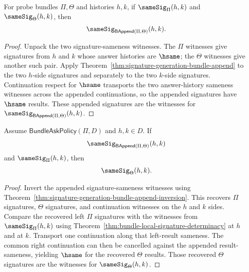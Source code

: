 \begin{theorem}
\label{thm:samesig-bundle-append-closure}
For probe bundles $\Pi,\Theta$ and histories $h,k$, if $\sameSig_\Pi(h,k)$ and $\sameSig_\Theta(h,k)$, then
$$
\sameSig_{\mathsf{BAppend}(\Pi,\Theta)}(h,k).
$$
\end{theorem}
\begin{proof}
Unpack the two signature-sameness witnesses. The $\Pi$ witnesses give signatures from $h$ and $k$ whose answer histories are $\hsame$; the $\Theta$ witnesses give another such pair. Apply Theorem~\ref{thm:signature-generation-bundle-append} to the two $h$-side signatures and separately to the two $k$-side signatures. Continuation respect for $\hsame$ transports the two answer-history sameness witnesses across the appended continuations, so the appended signatures have $\hsame$ results. These appended signatures are the witnesses for $\sameSig_{\mathsf{BAppend}(\Pi,\Theta)}(h,k)$.
\end{proof}

\begin{theorem}
\label{thm:samesig-bundle-append-left-cancellation}
Assume $\mathsf{BundleAskPolicy}(\Pi,D)$ and $h,k\in D$. If
$$
\sameSig_{\mathsf{BAppend}(\Pi,\Theta)}(h,k)
$$
and $\sameSig_\Pi(h,k)$, then
$$
\sameSig_\Theta(h,k).
$$
\end{theorem}
\begin{proof}
Invert the appended signature-sameness witnesses using Theorem~\ref{thm:signature-generation-bundle-append-inversion}. This recovers $\Pi$ signatures, $\Theta$ signatures, and continuation witnesses on the $h$ and $k$ sides. Compare the recovered left $\Pi$ signatures with the witnesses from $\sameSig_\Pi(h,k)$ using Theorem~\ref{thm:bundle-local-signature-determinacy} at $h$ and at $k$. Transport one continuation along that left-result sameness. The common right continuation can then be cancelled against the appended result-sameness, yielding $\hsame$ for the recovered $\Theta$ results. Those recovered $\Theta$ signatures are the witnesses for $\sameSig_\Theta(h,k)$.
\end{proof}

